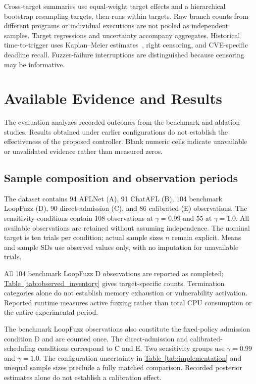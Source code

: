 \documentclass[final,5p,times,number]{elsarticle}
\newcommand{\namedref}[2]{\hyperref[#2]{#1~\ref*{#2}}}
\begin{document}
Cross-target summaries use equal-weight target effects and a hierarchical bootstrap resampling targets, then runs within targets. Raw branch counts from different programs or individual executions are not pooled as independent samples. Target regressions and uncertainty accompany aggregates. Historical time-to-trigger uses Kaplan--Meier estimates~\cite{kaplan1958}, right censoring, and CVE-specific deadline recall. Fuzzer-failure interruptions are distinguished because censoring may be informative.


\section{Available Evidence and Results}
\label{sec:results}
The evaluation analyzes recorded outcomes from the benchmark and ablation studies. Results obtained under earlier configurations do not establish the effectiveness of the proposed controller. Blank numeric cells indicate unavailable or unvalidated evidence rather than measured zeros.

\subsection{Sample composition and observation periods}
The dataset contains 94 AFLNet (A), 91 ChatAFL (B), 104 benchmark LoopFuzz (D), 90 direct-admission (C), and 86 calibrated (E) observations. The sensitivity conditions contain 108 observations at $\gamma=0.99$ and 55 at $\gamma=1.0$. All available observations are retained without assuming independence. The nominal target is ten trials per condition; actual sample sizes $n$ remain explicit. Means and sample SDs use observed values only, with no imputation for unavailable trials.

All 104 benchmark LoopFuzz D observations are reported as completed; \namedref{Table}{tab:observed_inventory} gives target-specific counts. Termination categories alone do not establish memory exhaustion or vulnerability activation. Reported runtime measures active fuzzing rather than total CPU consumption or the entire experimental period.

The benchmark LoopFuzz observations also constitute the fixed-policy admission condition D and are counted once. The direct-admission and calibrated-scheduling conditions correspond to C and E. Two sensitivity groups use $\gamma=0.99$ and $\gamma=1.0$. The configuration uncertainty in \namedref{Table}{tab:implementation} and unequal sample sizes preclude a fully matched comparison. Recorded posterior estimates alone do not establish a calibration effect.
\end{document}
